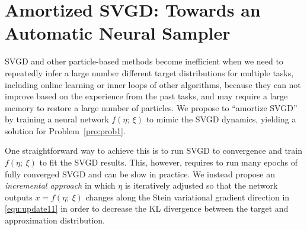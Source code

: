 \documentclass{article} \usepackage{iclr2017_conference,times}
\begin{document}
\section{Amortized SVGD: Towards an Automatic Neural Sampler}
\label{sec:amortizedsvgd}


SVGD and other particle-based methods become inefficient when we need to repeatedly infer
a large number different target distributions for multiple tasks, including online learning or inner loops of other algorithms, 
because they can not improve based on the experience from the past tasks, and may require a large memory to restore a large number of particles. 
We propose to ``amortize SVGD'' by training a neural network $f(\eta;~\xi)$ to mimic the SVGD dynamics, yielding a solution for Problem~\ref{pro:prob1}. 

One straightforward way to achieve this is to run SVGD to convergence and 
train $f(\eta;~\xi)$ to fit the SVGD results. 
This, however, requires to run many epochs of fully converged SVGD and can be slow in practice. 
We instead propose an \emph{incremental approach} in which $\eta$ is iteratively adjusted 
so that the network outputs $x = f(\eta;~\xi)$ changes along the Stein variational gradient direction in \eqref{equ:update11} 
in order to decrease the KL divergence between the target and approximation distribution. 
\end{document}
